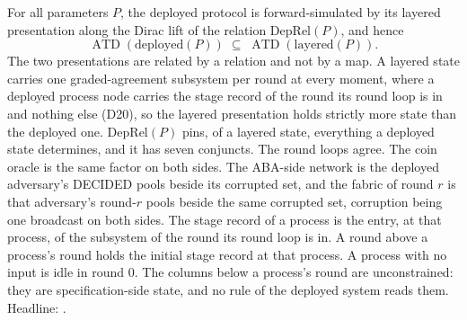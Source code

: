 \begin{theorem}
  \label{thm:aba-deployed-layered}
  \leanok
  For all parameters $P$, the deployed protocol is forward-simulated by its layered presentation along the Dirac lift of the relation $\mathrm{DepRel}(P)$, and hence
  \[
    \operatorname{ATD}(\mathrm{deployed}(P)) \;\subseteq\;
    \operatorname{ATD}(\mathrm{layered}(P)).
  \]
  The two presentations are related by a relation and not by a map.
  A layered state carries one graded-agreement subsystem per round at every moment, where a deployed process node carries the stage record of the round its round loop is in and nothing else (D20), so the layered presentation holds strictly more state than the deployed one.
  $\mathrm{DepRel}(P)$ pins, of a layered state, everything a deployed state determines, and it has seven conjuncts.
  The round loops agree.
  The coin oracle is the same factor on both sides.
  The ABA-side network is the deployed adversary's DECIDED pools beside its corrupted set, and the fabric of round $r$ is that adversary's round-$r$ pools beside the same corrupted set, corruption being one broadcast on both sides.
  The stage record of a process is the entry, at that process, of the subsystem of the round its round loop is in.
  A round above a process's round holds the initial stage record at that process.
  A process with no input is idle in round $0$.
  The columns below a process's round are unconstrained: they are specification-side state, and no rule of the deployed system reads them.
  Headline: .
\end{theorem}

